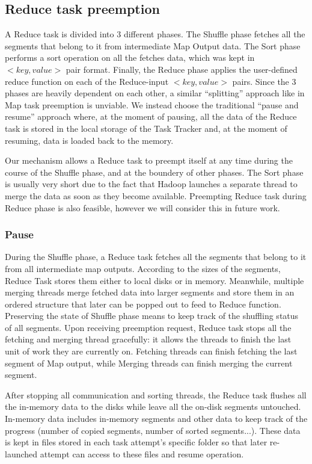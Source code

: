 \documentclass[runningheads,a4paper]{llncs}
\begin{document}
\subsection{Reduce task preemption}

A Reduce task is divided into 3 different phases. The Shuffle phase fetches all the segments that belong to it from intermediate Map Output data. The Sort phase performs a sort operation on all the fetches data, which was kept in $<key, value>$ pair format. Finally, the Reduce phase applies the user-defined reduce function on each of the Reduce-input $<key, value>$ pairs. Since the 3 phases are heavily dependent on each other, a similar “splitting” approach like in Map task preemption is unviable. We instead choose the traditional “pause and resume” approach where, at the moment of pausing, all the data of the Reduce task is stored in the local storage of the Task Tracker and, at the moment of resuming, data is loaded back to the memory.

Our mechanism allows a Reduce task to preempt itself at any time during the course of the Shuffle phase, and at the boundery of other phases. The Sort phase is usually very short due to the fact that Hadoop launches a separate thread to merge the data as soon as they become available. Preempting Reduce task during Reduce phase is also feasible, however we will consider this in future work.

\subsubsection{Pause}
During the Shuffle phase, a Reduce task fetches all the segments that belong to it from all intermediate map outputs. According to the sizes of the segments, Reduce Task stores them either to local disks or in memory. Meanwhile, multiple merging threads merge fetched data into larger segments and store them in an ordered structure that later can be popped out to feed to Reduce function. Preserving the state of Shuffle phase means to keep track of the shuffling status of all segments. Upon receiving preemption request, Reduce task stops all the fetching and merging thread gracefully: it allows the threads to finish the last unit of work they are currently on. Fetching threads can finish fetching the last segment of Map output, while Merging threads can finish merging the current segment.

After stopping all communication and sorting threads, the Reduce task flushes all the in-memory data to the disks while leave all the on-disk segments untouched. In-memory data includes in-memory segments and other data to keep track of the progress (number of copied segments, number of sorted segments...). These data is kept in files stored in each task attempt’s specific folder so that later re-launched attempt can access to these files and resume operation.
\end{document}
